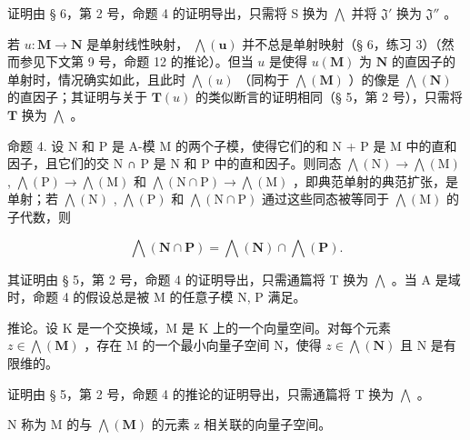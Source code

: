 证明由 § 6，第 2 号，命题 4 的证明导出，只需将 S 换为 \(\bigwedge\) 并将 \(\mathfrak{J}'\) 换为 \(\mathfrak{J}''\) 。

若 \(u: \mathbf{M} \to \mathbf{N}\) 是单射线性映射， \(\bigwedge(\mathbf{u})\) 并不总是单射映射（§ 6，练习 3）（然而参见下文第 9 号，命题 12 的推论）。但当 \(u\) 是使得 \(u(\mathbf{M})\) 为 \(\mathbf{N}\) 的直因子的单射时，情况确实如此，且此时 \(\bigwedge(u)\) （同构于 \(\bigwedge(\mathbf{M})\) ）的像是 \(\bigwedge(\mathbf{N})\) 的直因子；其证明与关于 \(\mathbf{T}(u)\) 的类似断言的证明相同（§ 5，第 2 号），只需将 \(\mathbf{T}\) 换为 \(\bigwedge\) 。

命题 4. 设 N 和 P 是 A-模 M 的两个子模，使得它们的和 N + P 是 M 中的直和因子，且它们的交 N ∩ P 是 N 和 P 中的直和因子。则同态 \(\bigwedge(\mathrm{N}) \to \bigwedge(\mathrm{M})\) , \(\bigwedge(\mathrm{P}) \to \bigwedge(\mathrm{M})\) 和 \(\bigwedge(\mathrm{N} \cap \mathrm{P}) \to \bigwedge(\mathrm{M})\) ，即典范单射的典范扩张，是单射；若 \(\bigwedge(\mathrm{N})\) , \(\bigwedge(\mathrm{P})\) 和 \(\bigwedge(\mathrm{N} \cap \mathrm{P})\) 通过这些同态被等同于 \(\bigwedge(\mathrm{M})\) 的子代数，则

\[
\bigwedge (\mathbf {N} \cap \mathbf {P}) = \bigwedge (\mathbf {N}) \cap \bigwedge (\mathbf {P}).\tag{5}
\]

其证明由 § 5，第 2 号，命题 4 的证明导出，只需通篇将 T 换为 \(\bigwedge\) 。当 A 是域时，命题 4 的假设总是被 M 的任意子模 N, P 满足。

推论。设 K 是一个交换域，M 是 K 上的一个向量空间。对每个元素 \(z \in \bigwedge(\mathbf{M})\) ，存在 M 的一个最小向量子空间 N，使得 \(z \in \bigwedge(\mathbf{N})\) 且 N 是有限维的。

证明由 § 5，第 2 号，命题 4 的推论的证明导出，只需通篇将 T 换为 \(\bigwedge\) 。

N 称为 M 的与 \(\bigwedge(\mathbf{M})\) 的元素 z 相关联的向量子空间。
\relax{}
